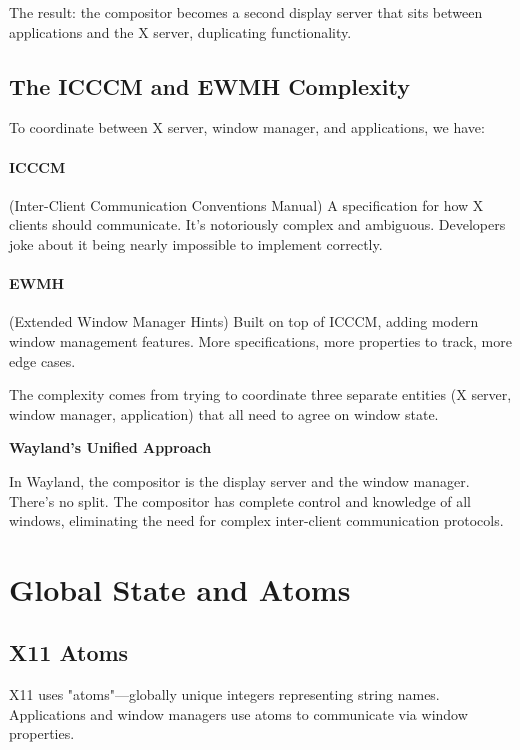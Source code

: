 The result: the compositor becomes a second display server that sits between applications and the X server, duplicating functionality.

\subsection{The ICCCM and EWMH Complexity}

To coordinate between X server, window manager, and applications, we have:

\paragraph{ICCCM} (Inter-Client Communication Conventions Manual)
A specification for how X clients should communicate. It's notoriously complex and ambiguous. Developers joke about it being nearly impossible to implement correctly.

\paragraph{EWMH} (Extended Window Manager Hints)
Built on top of ICCCM, adding modern window management features. More specifications, more properties to track, more edge cases.

The complexity comes from trying to coordinate three separate entities (X server, window manager, application) that all need to agree on window state.

\begin{designbox}
\textbf{Wayland's Unified Approach}

In Wayland, the compositor is the display server and the window manager. There's no split. The compositor has complete control and knowledge of all windows, eliminating the need for complex inter-client communication protocols.
\end{designbox}

\section{Global State and Atoms}

\subsection{X11 Atoms}

X11 uses "atoms"—globally unique integers representing string names. Applications and window managers use atoms to communicate via window properties.

